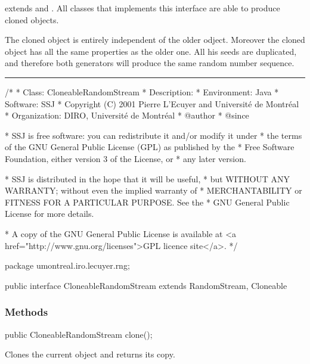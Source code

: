 
 extends  and . 
All classes that implements this interface are able to produce cloned objects.

The cloned object is entirely independent of the older odject.
Moreover the cloned object has all the same properties as the older one. 
All his seeds are duplicated, and therefore both generators will produce the
same random number sequence.

\bigskip\hrule

\begin{code}
\begin{hide}
/*
 * Class:        CloneableRandomStream
 * Description:  
 * Environment:  Java
 * Software:     SSJ 
 * Copyright (C) 2001  Pierre L'Ecuyer and Université de Montréal
 * Organization: DIRO, Université de Montréal
 * @author       
 * @since

 * SSJ is free software: you can redistribute it and/or modify it under
 * the terms of the GNU General Public License (GPL) as published by the
 * Free Software Foundation, either version 3 of the License, or
 * any later version.

 * SSJ is distributed in the hope that it will be useful,
 * but WITHOUT ANY WARRANTY; without even the implied warranty of
 * MERCHANTABILITY or FITNESS FOR A PARTICULAR PURPOSE.  See the
 * GNU General Public License for more details.

 * A copy of the GNU General Public License is available at
   <a href="http://www.gnu.org/licenses">GPL licence site</a>.
 */
\end{hide}
package umontreal.iro.lecuyer.rng;

public interface CloneableRandomStream extends RandomStream, Cloneable \begin{hide} { \end{hide}
\end{code}

\subsubsection* {Methods}
\begin{code}

   public CloneableRandomStream clone();
\end{code}
 \begin{tabb} Clones the current object and returns its copy.
 \end{tabb}
 \begin{htmlonly}
\end{htmlonly}

\begin{code}\begin{hide} 
}
\end{hide}
\end{code}
